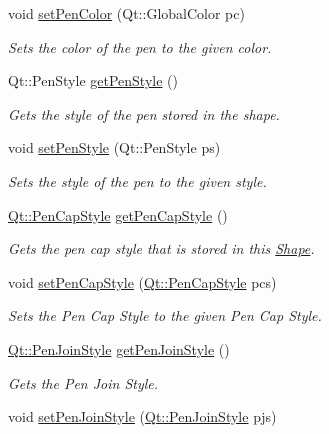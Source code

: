 \begin{DoxyCompactItemize}
void \hyperlink{classPolyline_a69a07839c0f7c67efe10701bd7d7cf8e}{set\+Pen\+Color} (Qt\+::\+Global\+Color pc)
\begin{DoxyCompactList}\small\item\em Sets the color of the pen to the given color. \end{DoxyCompactList}\item 
Qt\+::\+Pen\+Style \hyperlink{classPolyline_aefe298425b83dbc94724ab5cb215bba3}{get\+Pen\+Style} ()
\begin{DoxyCompactList}\small\item\em Gets the style of the pen stored in the shape. \end{DoxyCompactList}\item 
void \hyperlink{classPolyline_ae5af058a4a94979fa88c2c3267da9087}{set\+Pen\+Style} (Qt\+::\+Pen\+Style ps)
\begin{DoxyCompactList}\small\item\em Sets the style of the pen to the given style. \end{DoxyCompactList}\item 
\hyperlink{shape__input__file__specs_8txt_a622efdcfef6789d4367974d2fe79019e}{Qt\+::\+Pen\+Cap\+Style} \hyperlink{classPolyline_acd78e365c667da035656279076bf5fe1}{get\+Pen\+Cap\+Style} ()
\begin{DoxyCompactList}\small\item\em Gets the pen cap style that is stored in this \hyperlink{classShape}{Shape}. \end{DoxyCompactList}\item 
void \hyperlink{classPolyline_a34510d4e398ec607c0ec125f380f30ff}{set\+Pen\+Cap\+Style} (\hyperlink{shape__input__file__specs_8txt_a622efdcfef6789d4367974d2fe79019e}{Qt\+::\+Pen\+Cap\+Style} pcs)
\begin{DoxyCompactList}\small\item\em Sets the Pen Cap Style to the given Pen Cap Style. \end{DoxyCompactList}\item 
\hyperlink{shape__input__file__specs_8txt_a007db2043c6063881de2043c05c9c4a9}{Qt\+::\+Pen\+Join\+Style} \hyperlink{classPolyline_a6bd520d9c7fef132bc43cbf61168917c}{get\+Pen\+Join\+Style} ()
\begin{DoxyCompactList}\small\item\em Gets the Pen Join Style. \end{DoxyCompactList}\item 
void \hyperlink{classPolyline_a3e792c8055d6c064afd6d6d07c7d8843}{set\+Pen\+Join\+Style} (\hyperlink{shape__input__file__specs_8txt_a007db2043c6063881de2043c05c9c4a9}{Qt\+::\+Pen\+Join\+Style} pjs)

\end{DoxyCompactItemize}

